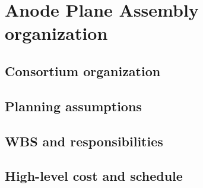 \chapter{Anode Plane Assembly organization}
\label{ch:fdsp-apa-org}

\section{Consortium organization}
\label{sec:fdsp-apa-org-consortium}


\section{Planning assumptions}
\label{sec:fdsp-apa-org-assmp}


\section{WBS and responsibilities}
\label{sec:fdsp-apa-org-wbs}

\section{High-level cost and schedule}
\label{sec:fdsp-apa-org-cs}





